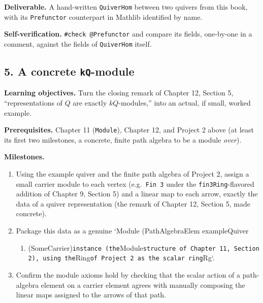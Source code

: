\textbf{Deliverable.} A hand-written \texttt{QuiverHom} between two quivers from this book, with its \texttt{Prefunctor} counterpart in Mathlib identified by name.

\textbf{Self-verification.} \texttt{\#check @Prefunctor} and compare its fields, one-by-one in a comment, against the fields of \texttt{QuiverHom} itself.

\subsection{\texorpdfstring{5. A concrete \texttt{kQ}-module}{5. A concrete kQ-module}}\label{sec:14-next-steps:03-next-projects:6}

\textbf{Learning objectives.} Turn the closing remark of Chapter 12, Section 5, ``representations of \(Q\) are exactly \(kQ\)-modules,'' into an actual, if small, worked example.

\textbf{Prerequisites.} Chapter 11 (\texttt{Module}), Chapter 12, and Project 2 above (at least its first two milestones, a concrete, finite path algebra to be a module \emph{over}).

\textbf{Milestones.}

\begin{enumerate}
\def\labelenumi{\arabic{enumi}.}
\tightlist
\item
  Using the example quiver and the finite path algebra of Project 2, assign a small carrier module to each vertex (e.g.~\texttt{Fin 3} under the \texttt{fin3Ring}-flavored addition of Chapter 9, Section 5) and a linear map to each arrow, exactly the data of a quiver representation (the remark of Chapter 12, Section 5, made concrete).
\item
  Package this data as a genuine `Module (PathAlgebraElem exampleQuiver

  \begin{enumerate}
  \def\labelenumii{\alph{enumii})}
  \setcounter{enumii}{10}
  \tightlist
  \item
    (SomeCarrier)\texttt{instance (the}Module\texttt{structure of Chapter 11, Section 2), using the}Ring\texttt{of Project 2 as the scalar ring}Rg`.
  \end{enumerate}
\item
  Confirm the module axioms hold by checking that the scalar action of a path-algebra element on a carrier element agrees with manually composing the linear maps assigned to the arrows of that path.
\end{enumerate}

